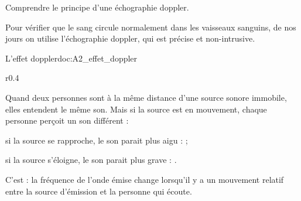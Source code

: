 \teteTermStssImag



\begin{objectifs}
  \item Comprendre le principe d'une échographie doppler.
\end{objectifs}

\begin{contexte}
  Pour vérifier que le sang circule normalement dans les vaisseaux sanguins, de nos jours on utilise l'échographie doppler, qui est précise et non-intrusive.
  
\end{contexte}


\begin{doc}{L'effet doppler}{doc:A2_effet_doppler}
  \begin{wrapfigure}[4]{r}{0.4\linewidth}
    \centering
    \vspace*{-35pt}
  \end{wrapfigure}
  
  Quand deux personnes sont à la même distance d'une source sonore immobile, elles entendent le même son.
  Mais si la source est en mouvement, chaque personne perçoit un son différent :
  \begin{listePoints}
    \item si la source se rapproche, le son parait plus aigu :  ;
    \item si la source s'éloigne, le son parait plus grave : .
  \end{listePoints}
  
  \begin{importants}  
    C'est  : la fréquence de l'onde émise change lorsqu'il y a un mouvement relatif entre la source d'émission et la personne qui écoute.
  \end{importants}
\end{doc}



